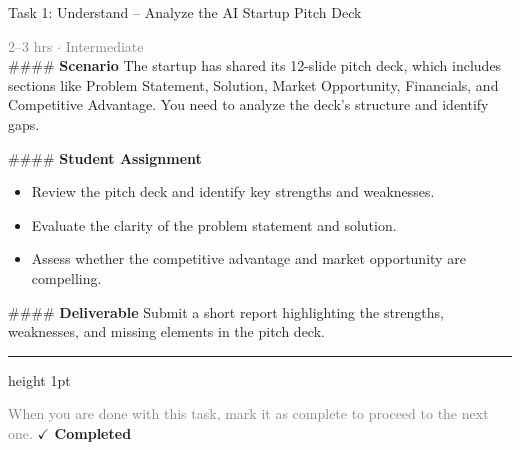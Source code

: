 \documentclass[10pt,a4paper]{article}
\begin{document}
\begin{taskbox}{Task 1: Understand – Analyze the AI Startup Pitch Deck}

    {\small \textcolor{gray}{2--3 hrs $\cdot$ Intermediate}}\\[12pt]

    \#\#\#\# \textbf{Scenario}  
The startup has shared its 12-slide pitch deck, which includes sections like Problem Statement, Solution, Market Opportunity, Financials, and Competitive Advantage. You need to analyze the deck’s structure and identify gaps.  

\#\#\#\# \textbf{Student Assignment}  
\begin{itemize}
    \item Review the pitch deck and identify key strengths and weaknesses.  
    \item Evaluate the clarity of the problem statement and solution.  
    \item Assess whether the competitive advantage and market opportunity are compelling.  
\end{itemize}

\#\#\#\# \textbf{Deliverable}  
Submit a short report highlighting the strengths, weaknesses, and missing elements in the pitch deck.\par

    \vspace{16pt}

    \textcolor{cardBorder}{\hrule height 1pt}\vspace{8pt}

    \small \textcolor{gray}{When you are done with this task, mark it as complete to proceed to the next one.} \hfill \textbf{\textcolor{brandDark}{$\checkmark$ Completed}}

\end{taskbox}
\end{document}
